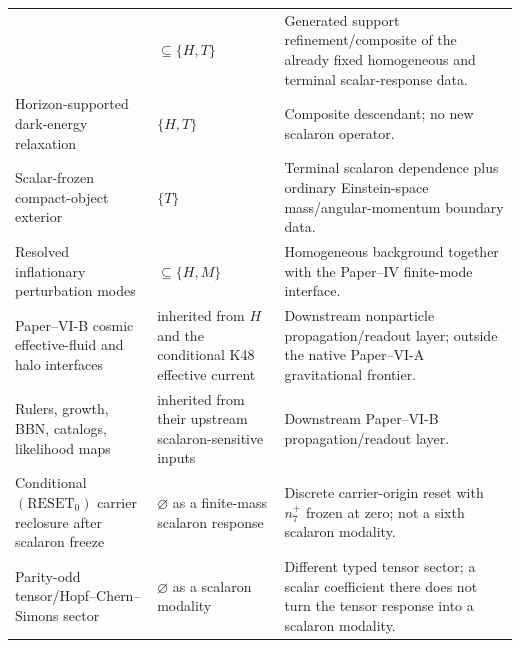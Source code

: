 \documentclass[12pt,a4paper]{article}
\begin{document}
\begin{center}
\begin{xltabular}{0.98\textwidth}{@{}>{\raggedright\arraybackslash}p{0.30\textwidth}>{\raggedright\arraybackslash}p{0.18\textwidth}>{\raggedright\arraybackslash}X@{}}
& $\subseteq\{H,T\}$
& Generated support refinement/composite of the already fixed homogeneous and terminal scalar-response data. \\
Horizon-supported dark-energy relaxation
& $\{H,T\}$
& Composite descendant; no new scalaron operator. \\
Scalar-frozen compact-object exterior
& $\{T\}$
& Terminal scalaron dependence plus ordinary Einstein-space mass/angular-momentum boundary data. \\
Resolved inflationary perturbation modes
& $\subseteq\{H,M\}$
& Homogeneous background together with the Paper--IV finite-mode interface. \\
Paper--VI-B cosmic effective-fluid and halo interfaces
& inherited from $H$ and the conditional K48 effective current
& Downstream nonparticle propagation/readout layer; outside the native Paper--VI-A gravitational frontier. \\
Rulers, growth, BBN, catalogs, likelihood maps
& inherited from their upstream scalaron-sensitive inputs
& Downstream Paper--VI-B propagation/readout layer. \\
Conditional \((\mathrm{RESET}_0)\) carrier reclosure after scalaron freeze
& $\varnothing$ as a finite-mass scalaron response
& Discrete carrier-origin reset with \(n_7^+\) frozen at zero; not a sixth scalaron modality. \\
Parity-odd tensor/Hopf--Chern--Simons sector
& $\varnothing$ as a scalaron modality
& Different typed tensor sector; a scalar coefficient there does not turn the tensor response into a scalaron modality. \\
\bottomrule
\end{xltabular}
\end{center}
\end{document}
